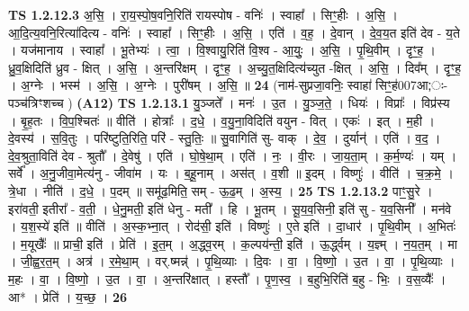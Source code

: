 \documentclass[17pt]{extarticle}
\begin{document}
                  \newline
                                \textbf{ TS 1.2.12.3} \newline
                  अ॒सि॒ । रा॒य॒स्पो॒ष॒वनि॒रिति॑ रायस्पोष - वनिः॑ । स्वाहा᳚ । सिꣳ॒॒हीः । अ॒सि॒ । आ॒दि॒त्य॒वनि॒रित्या॑दित्य - वनिः॑ । स्वाहा᳚ । सिꣳ॒॒हीः । अ॒सि॒ । एति॑ । व॒ह॒ । दे॒वान् । दे॒व॒य॒त इति॑ देव - य॒ते । यज॑मानाय । स्वाहा᳚ । भू॒तेभ्यः॑ । त्वा॒ । वि॒श्वायु॒रिति॑ वि॒श्व - आ॒युः॒ । अ॒सि॒ । पृ॒थि॒वीम् । दृꣳ॒॒ह॒ । ध्रु॒व॒क्षिदिति॑ ध्रुव - क्षित् । अ॒सि॒ । अ॒न्तरि॑क्षम् । दृꣳ॒॒ह॒ । अ॒च्यु॒त॒क्षिदित्य॑च्युत -क्षित् । अ॒सि॒ । दिव᳚म् । दृꣳ॒॒ह॒ । अ॒ग्नेः । भस्म॑ । अ॒सि॒ । अ॒ग्नेः । पुरी॑षम् । अ॒सि॒ ॥ \textbf{  24} \newline
                  \newline
                      (नाम॑-सुप्रजा॒वनिः॒ स्वाहा॑ सिꣳ॒॒ह॑007आ;ः-पञ्च॑त्रिꣳशच्च )  \textbf{(A12)} \newline \newline
                                \textbf{ TS 1.2.13.1} \newline
                  यु॒ञ्जते᳚ । मनः॑ । उ॒त । यु॒ञ्ज॒ते॒ । धियः॑ । विप्राः᳚ । विप्र॑स्य । बृ॒ह॒तः । वि॒प॒श्चितः॑ ॥ वीति॑ । होत्राः᳚ । द॒धे॒ । व॒यु॒ना॒विदिति॑ वयुन - वित् । एकः॑ । इत् । म॒ही । दे॒वस्य॑ । स॒वि॒तुः । परि॑ष्टुति॒रिति॒ परि॑ - स्तु॒तिः॒ ॥ सु॒वागिति॑ सु- वाक् । दे॒व॒ । दुर्यान्॑ । एति॑ । व॒द॒ । दे॒व॒श्रुता॒विति॑ देव - श्रुतौ᳚ । दे॒वेषु॑ । एति॑ । घो॒षे॒था॒म् । एति॑ । नः॒ । वी॒रः । जा॒य॒ता॒म् । क॒र्म॒ण्यः॑ । यम् । सर्वे᳚ । अ॒नु॒जीवा॒मेत्य॑नु - जीवा॑म । यः । ब॒हू॒नाम् । अस॑त् । व॒शी ॥ इ॒दम् । विष्णुः॑ । वीति॑ । च॒क्र॒मे॒ । त्रे॒धा । नीति॑ । द॒धे॒ । प॒दम् ॥ समू॑ढ॒मिति॒ सम् - ऊ॒ढ॒म् । अ॒स्य॒ । \textbf{  25} \newline
                  \newline
                                \textbf{ TS 1.2.13.2} \newline
                  पाꣳ॒॒सु॒रे । इरा॑वती॒ इतीरा᳚ - व॒ती॒ । धे॒नु॒मती॒ इति॑ धेनु - मती᳚ । हि । भू॒तम् । सू॒य॒व॒सिनी॒ इति॑ सु - य॒व॒सिनी᳚ । मन॑वे । य॒श॒स्ये॑ इति॑ ॥ वीति॑ । अ॒स्क॒भ्ना॒त् । रोद॑सी॒ इति॑ । विष्णुः॑ । ए॒ते इति॑ । दा॒धार॑ । पृ॒थि॒वीम् । अ॒भितः॑ । म॒यूखैः᳚ ॥ प्राची॒ इति॑ । प्रेति॑ । इ॒त॒म् । अ॒द्ध्व॒रम् । क॒ल्पय॑न्ती॒ इति॑ । ऊ॒र्द्ध्वम् । य॒ज्ञ्म् । न॒य॒त॒म् । मा । जी॒ह्व॒र॒त॒म् । अत्र॑ । र॒मे॒था॒म् । वर्.ष्मन्न्॑ । पृ॒थि॒व्याः । दि॒वः । वा॒ । वि॒ष्णो॒ । उ॒त । वा॒ । पृ॒थि॒व्याः । म॒हः । वा॒ । वि॒ष्णो॒ । उ॒त । वा॒ । अ॒न्तरि॑क्षात् । हस्तौ᳚ । पृ॒ण॒स्व॒ । ब॒हुभि॒रिति॑ ब॒हु - भिः॒ । व॒स॒व्यैः᳚ । आ* । प्रेति॑ । य॒च्छ॒ । \textbf{  26} \newline
\end{document}
